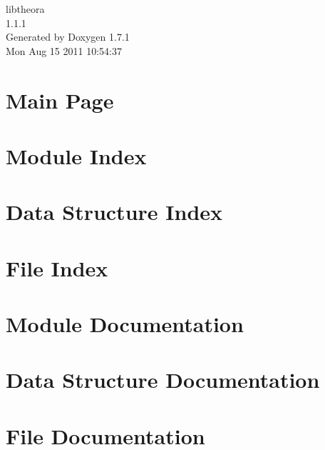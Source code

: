 \documentclass[a4paper]{book}
\begin{document}
\begin{titlepage}
\vspace*{7cm}
\begin{center}
{\Large libtheora \\[1ex]\large 1.1.1 }\\
\vspace*{1cm}
{\large Generated by Doxygen 1.7.1}\\
\vspace*{0.5cm}
{\small Mon Aug 15 2011 10:54:37}\\
\end{center}
\end{titlepage}
\clearemptydoublepage
{}
\tableofcontents
\clearemptydoublepage
{}
\chapter{Main Page}
\label{index}
\chapter{Module Index}

\chapter{Data Structure Index}

\chapter{File Index}

\chapter{Module Documentation}




\chapter{Data Structure Documentation}











\chapter{File Documentation}




\printindex
\end{document}
